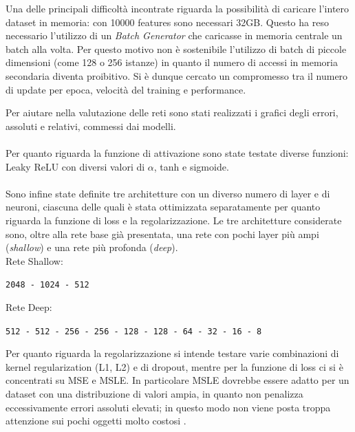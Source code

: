 Una delle principali difficoltà incontrate riguarda la possibilità di caricare l'intero dataset in memoria:
con 10000 features sono necessari 32GB. Questo ha reso necessario l'utilizzo di un \emph{Batch Generator} 
che caricasse in memoria centrale un batch alla volta. Per questo motivo non è sostenibile l'utilizzo 
di batch di piccole dimensioni (come 128 o 256 istanze) in quanto il numero di accessi in memoria 
secondaria diventa proibitivo. Si è dunque cercato un compromesso tra il numero di update per epoca, 
velocità del training e performance.

Per aiutare nella valutazione delle reti sono stati realizzati i grafici degli errori, assoluti e relativi, commessi 
dai modelli.

\paragraph{} Per quanto riguarda la funzione di attivazione sono state testate diverse funzioni: 
Leaky ReLU con diversi valori di $\alpha$, tanh e sigmoide.

\paragraph{} Sono infine state definite tre architetture con un diverso numero di layer e di neuroni,
ciascuna delle quali è stata ottimizzata separatamente per quanto riguarda la funzione di loss e la 
regolarizzazione. Le tre architetture considerate sono, oltre alla rete base già presentata, una 
rete con pochi layer più ampi (\emph{shallow}) e una rete più profonda (\emph{deep}).
\\

Rete Shallow:
\begin{center}
	{\tt 2048 - 1024 - 512}
\end{center}

Rete Deep:
\begin{center}
	{\tt 512 - 512 - 256 - 256 - 128 - 128 - 64 - 32 - 16 - 8}
\end{center}

Per quanto riguarda la regolarizzazione si intende testare varie combinazioni di kernel regularization 
(L1, L2) e di dropout, mentre per la funzione di loss ci si è concentrati su MSE e MSLE. In particolare 
	MSLE dovrebbe essere adatto per un dataset con una distribuzione di valori ampia, in quanto non 
	penalizza eccessivamente errori assoluti elevati; in questo modo non viene posta troppa attenzione 
	sui pochi oggetti molto costosi \cite{rmsle}.

